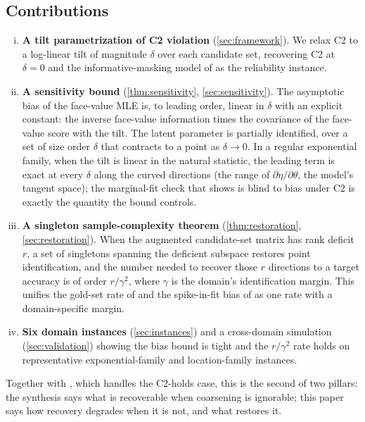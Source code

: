 \subsection{Contributions}

\begin{enumerate}[(i)]
\item \textbf{A tilt parametrization of C2 violation} (\cref{sec:framework}).
  We relax C2 to a log-linear tilt of magnitude $\delta$ over each candidate set,
  recovering C2 at $\delta = 0$ and the informative-masking model of
  \citet{towell2026mdrelax} as the reliability instance.
\item \textbf{A sensitivity bound} (\cref{thm:sensitivity}, \cref{sec:sensitivity}).
  The asymptotic bias of the face-value MLE is, to leading order, linear in
  $\delta$ with an explicit constant: the inverse face-value information times the
  covariance of the face-value score with the tilt. The latent parameter is
  partially identified, over a set of size order $\delta$ that contracts to a point
  as $\delta \to 0$. In a regular exponential family, when the tilt is linear in the
  natural statistic, the leading term is exact at every $\delta$ along the curved
  directions (the range of $\partial \eta / \partial \theta$, the model's tangent
  space); the marginal-fit check that \citet{towell2026synthesis} shows is blind to
  bias under C2 is exactly the quantity the bound controls.
\item \textbf{A singleton sample-complexity theorem}
  (\cref{thm:restoration}, \cref{sec:restoration}). When the augmented
  candidate-set matrix has rank deficit $r$, a set of singletons spanning the
  deficient subspace restores point identification, and the number needed to
  recover those $r$ directions to a target accuracy is of order $r / \gamma^2$,
  where $\gamma$ is the domain's identification margin. This unifies the gold-set
  rate of \citet{towell2026weaksupcoarsening} and the spike-in-fit bias of
  \citet{towell2026scrnacoarsening} as one rate with a domain-specific margin.
\item \textbf{Six domain instances} (\cref{sec:instances}) and a cross-domain
  simulation (\cref{sec:validation}) showing the bias bound is tight and the
  $r/\gamma^2$ rate holds on representative exponential-family and location-family
  instances.
\end{enumerate}

Together with \citet{towell2026synthesis}, which handles the C2-holds case, this is
the second of two pillars: the synthesis says what is recoverable when coarsening is
ignorable; this paper says how recovery degrades when it is not, and what restores
it.
